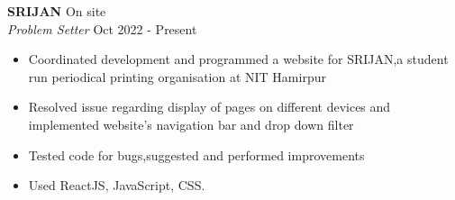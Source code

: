 \documentclass[a4paper]{article}
\newcommand{\lineunder} {
    \vspace*{-8pt} \\
    \hspace*{-18pt} \hrulefill \\
}
\newcommand{\header} [1] {
    {\hspace*{-18pt}\vspace*{6pt} \textsc{#1}}
    \vspace*{-6pt} \lineunder
}
\begin{document}


\textbf{SRIJAN} \hfill On site\\
\textit{Problem Setter} \hfill Oct 2022 - Present\\
\begin{itemize}
	\item Coordinated development and programmed a website for SRIJAN,a student run periodical printing organisation at NIT Hamirpur
    \item Resolved issue regarding display of pages on different devices and implemented website's navigation bar and drop down filter
    \item Tested code for bugs,suggested and performed improvements
    \item Used ReactJS, JavaScript, CSS.
\end{itemize}
\vspace{1.5mm}



\end{document}

